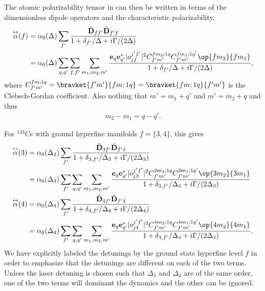 \documentclass[]{report}
\newcommand{\tensor}[1]{\overset{\leftrightarrow}{#1}} %
\begin{document}
The atomic polarizability tensor in  can then be written in terms of the dimensionless dipole operators and the characteristic polarizability,
\begin{align} \label{Eq::AtomicPolarizabilityF}
\tensor{\alpha}(f) &=  \alpha_0(\Delta) \sum_{f'} \frac{ \hat{\mathbf{D}}_{f f'} \hat{\mathbf{D}}_{f' f}}{ 1 + \delta_{f'} / \Delta + i \Gamma/(2\Delta)}\\
& = \alpha_0(\Delta) \sum_{q,q'}  \sum_{f,f'} \sum_{m_1, m_2, m'}  \frac{\mathbf{e}_q \mathbf{e}^*_{q'} | o^{j'f'}_{jf} |^2 C^{fm_2;1q}_{f'm'} C^{fm_1;1q'}_{f'm'} \op{f m_2}{f m_1}}{1 + \delta_{f'} / \Delta + i \Gamma/(2\Delta)},
\end{align}
where $ C^{fm;1q}_{f'm'}=  \bravket{f' m'}{f m; 1 q}= \bravket{f m; 1 q}{f' m'}$ is the Clebsch-Gordan coefficient. Also nothing that $m' = m_1 + q'$ and $m' = m_2 + q$ and thus
\begin{align}
	m_2 - m_1 = q-q'.
\end{align}

For ${}^{133}$Cs with ground hyperfine manifolds $f = \{3,4\}$, this gives
\begin{align}
\tensor{\alpha}(3) 
		& = \alpha_0(\Delta_{3}) \sum_{f'} \frac{ \hat{\mathbf{D}}_{3 f'} \hat{\mathbf{D}}_{f' 3}}{ 1 + \delta_{3, f'} / \Delta_{3} + i \Gamma/(2\Delta_3) } \\
		&= \alpha_0(\Delta_{3}) \sum_{f'} \sum_{q,q'} \sum_{m_1, m_2, m'}\frac{ \mathbf{e}_q \mathbf{e}^*_{q'} | o^{j'f'}_{j3} |^2 C^{3m_2;1q}_{f'm'} C^{3m_1;1q'}_{f'm'} \op{3 m_2}{3 m_1}}{ 1 + \delta_{3, f'} / \Delta_{3} + i \Gamma/(2\Delta_3) }\\
\tensor{\alpha}(4) &=\alpha_0(\Delta_{4}) \sum_{f'} \frac{ \hat{\mathbf{D}}_{4 f'} \hat{\mathbf{D}}_{f' 4}}{ 1 + \delta_{4, f'} / \Delta_{4} + i \Gamma/(2\Delta_4) }\\
	 &= \alpha_0(\Delta_{4}) \sum_{f'} \sum_{q,q'} \sum_{m_1, m_2, m'}\frac{ \mathbf{e}_q \mathbf{e}^*_{q'} | o^{j'f'}_{j4} |^2 C^{4m_2;1q}_{f'm'} C^{4m_1;1q'}_{f'm'} \op{4 m_2}{4 m_1}}{ 1 + \delta_{4, f'} / \Delta_{4} + i \Gamma/(2\Delta_4)} .
\end{align}
We have explicitly labeled the detunings by the ground state hyperfine level $f$ in order to emphasize that the detunings are different on each of the two terms.  Unless the laser detuning is chosen such that $\Delta_3$ and $\Delta_4$ are of the same order, one of the two terms will dominant the dynamics and the other can be ignored.


\end{document}
